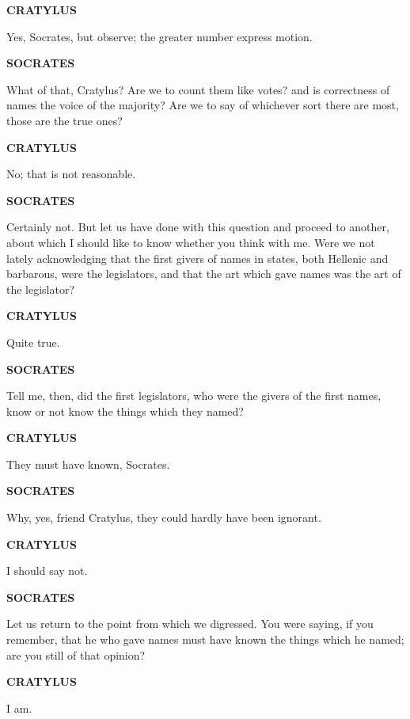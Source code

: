 \documentclass[11pt,letter]{article}
\begin{document}
\par \textbf{CRATYLUS}
\par   Yes, Socrates, but observe; the greater number express motion.

\par \textbf{SOCRATES}
\par   What of that, Cratylus? Are we to count them like votes? and is correctness of names the voice of the majority? Are we to say of whichever sort there are most, those are the true ones?

\par \textbf{CRATYLUS}
\par   No; that is not reasonable.

\par \textbf{SOCRATES}
\par   Certainly not. But let us have done with this question and proceed to another, about which I should like to know whether you think with me. Were we not lately acknowledging that the first givers of names in states, both Hellenic and barbarous, were the legislators, and that the art which gave names was the art of the legislator?

\par \textbf{CRATYLUS}
\par   Quite true.

\par \textbf{SOCRATES}
\par   Tell me, then, did the first legislators, who were the givers of the first names, know or not know the things which they named?

\par \textbf{CRATYLUS}
\par   They must have known, Socrates.

\par \textbf{SOCRATES}
\par   Why, yes, friend Cratylus, they could hardly have been ignorant.

\par \textbf{CRATYLUS}
\par   I should say not.

\par \textbf{SOCRATES}
\par   Let us return to the point from which we digressed. You were saying, if you remember, that he who gave names must have known the things which he named; are you still of that opinion?

\par \textbf{CRATYLUS}
\par   I am.
\end{document}
